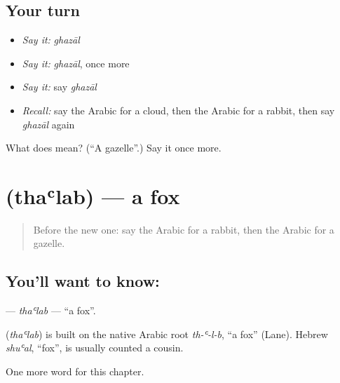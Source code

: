 \subsection*{Your turn}
\begin{itemize}
\raggedright
  \item \emph{Say it:} \emph{ghazāl}
  \item \emph{Say it:} \emph{ghazāl}, once more
  \item \emph{Say it:} say \emph{ghazāl}
  \item \emph{Recall:} say the Arabic for a cloud, then the Arabic for a rabbit, then say \emph{ghazāl} again
\end{itemize}

\begin{tcolorbox}[breakable,colback=teal!4,colframe=teal!35!black,title={Before you move on}]
What does  mean? (\textquotedblleft{}A gazelle\textquotedblright{}.) Say it once more.
\end{tcolorbox}
\section[\texorpdfstring{\ar{ثعلب} (thaʿlab)}{ثعلب (thaʿlab)}]{ (thaʿlab) — a fox}

\label{lesson:AR-C135-thalab}



\begin{quote}
Before the new one: say the Arabic for a rabbit, then the Arabic for a gazelle.
\end{quote}

\subsection*{You'll want to know: }
\textbf{} — \emph{thaʿlab} — \textquotedblleft{}a fox\textquotedblright{}.

\begin{cousinweb}
\textbf{} (\emph{thaʿlab}) is built on the native Arabic root \emph{th-ʿ-l-b}, \textquotedblleft{}a fox\textquotedblright{} (Lane). Hebrew \emph{shuʿal}, \textquotedblleft{}fox\textquotedblright{}, is usually counted a cousin.
\end{cousinweb}

\begin{grammarlens}[title={What you've built}]
One more word for this chapter.
\end{grammarlens}

